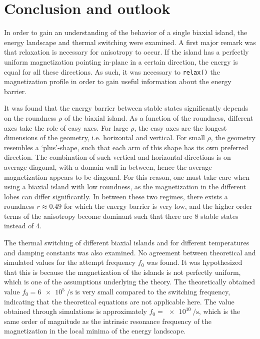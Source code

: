 \documentclass[11pt,a4paper,english]{article}
\newcommand{\code}[1]{\texttt{#1}}
\begin{document}
\clearpage
\section{Conclusion and outlook}
In order to gain an understanding of the behavior of a single biaxial island, the energy landscape and thermal switching were examined. A first major remark was that relaxation is necessary for anisotropy to occur. If the island has a perfectly uniform magnetization pointing in-plane in a certain direction, the energy is equal for all these directions. As such, it was necessary to \code{relax()} the magnetization profile in order to gain useful information about the energy barrier. \par
It was found that the energy barrier between stable states significantly depends on the roundness $\rho$ of the biaxial island. As a function of the roundness, different axes take the role of easy axes. For large $\rho$, the easy axes are the longest dimensions of the geometry, i.e. horizontal and vertical. For small $\rho$, the geometry resembles a `plus'-shape, such that each arm of this shape has its own preferred direction. The combination of such vertical and horizontal directions is on average diagonal, with a domain wall in between, hence the average magnetization appears to be diagonal. For this reason, one must take care when using a biaxial island with low roundness, as the magnetization in the different lobes can differ significantly. In between these two regimes, there exists a roundness $r\approx0.49$ for which the energy barrier is very low, and the higher order terms of the anisotropy become dominant such that there are 8 stable states instead of 4. \par
The thermal switching of different biaxial islands and for different temperatures and damping constants was also examined. No agreement between theoretical and simulated values for the attempt frequency $f_0$ was found. It was hypothesized that this is because the magnetization of the islands is not perfectly uniform, which is one of the assumptions underlying the theory. The theoretically obtained value $f_0=\SI{6e5}{\per\second}$ is very small compared to the switching frequency, indicating that the theoretical equations are not applicable here. The value obtained through simulations is approximately $f_0=\SI{e10}{\per\second}$, which is the same order of magnitude as the intrinsic resonance frequency of the magnetization in the local minima of the energy landscape. \par
\end{document}

